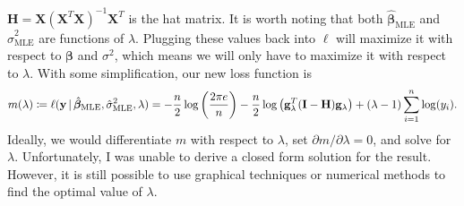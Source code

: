 \documentclass[10pt]{article}
\begin{document}
\begin{itemize}
    \(\mathbf{H} = \mathbf{X}(\mathbf{X}^T\mathbf{X})^{-1}\mathbf{X}^T\) is the hat matrix. 
    It is worth noting that both \(\hat{\bm{\beta}}_{\mathrm{MLE}}\) and \(\hat{\sigma}^2_{\mathrm{MLE}}\) are functions of \(\lambda\). 
    Plugging these values back into \(\ell\) will maximize it with respect to \(\bm{\beta}\) and \(\sigma^2\), 
    which means we will only have to maximize it with respect to \(\lambda\). 
    With some simplification, our new loss function is 
    \begin{align*}
        m(\lambda)
        \coloneqq \ell(\mathbf{y} \,|\, \hat{\bm{\beta}}_{\mathrm{MLE}}, \hat{\sigma}^2_{\mathrm{MLE}}, \lambda)
        = - \frac{n}{2} \log \left( \frac{2 \pi e}{n} \right) - \frac{n}{2} \log \big( \mathbf{g}_{\lambda}^T(\mathbf{I} - \mathbf{H}) \mathbf{g}_{\lambda} \big) + (\lambda - 1) \sum_{i=1}^n \log(y_i).
    \end{align*}
    Ideally, we would differentiate \(m\) with respect to \(\lambda\), set \(\partial m / \partial \lambda = 0\), and solve for \(\lambda\). Unfortunately, I was unable to 
    derive a closed form solution for the result. However, it is still possible to use graphical techniques or numerical methods to find the optimal value of \(\lambda\). 


\end{itemize}
\end{document}
